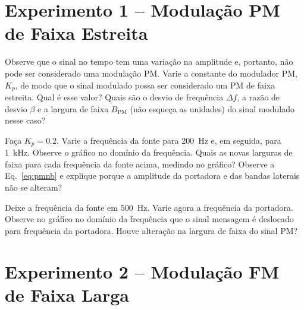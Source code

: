 \documentclass[12pt,addpoints]{exam}
\begin{document}
\section*{Experimento 1 -- Modulação PM de Faixa Estreita}

\begin{questions}
    \question Observe que o sinal no tempo tem uma variação na amplitude e, portanto, não pode ser considerado uma modulação PM. Varie a constante do modulador PM, $K_{p}$, de modo que o sinal modulado possa ser considerado um PM de faixa estreita. Qual é esse valor? Quais são o desvio de frequência $\Delta f$, a razão de desvio $\beta$ e a largura de faixa $B_{\text{PM}}$ (não esqueça as unidades) do sinal modulado nesse caso?
    \fillwithlines{1.25in}
    
    \question Faça $K_{p} = 0.2$. Varie a frequência da fonte para 200~Hz e, em seguida, para 1~kHz. Observe o gráfico no domínio da frequência. Quais as novas larguras de faixa para cada frequência da fonte acima, medindo no gráfico? Observe a Eq.~\ref{eq:pmnb} e explique porque a amplitude da portadora e das bandas laterais não se alteram?
    \fillwithlines{1.25in}
    
    \question Deixe a frequência da fonte em $500$~Hz. Varie agora a frequência da portadora. Observe no gráfico no domínio da frequência que o sinal mensagem é deslocado para frequência da portadora. Houve alteração na largura de faixa do sinal PM?
    \fillwithlines{1.25in}
\end{questions}

\section*{Experimento 2 -- Modulação FM de Faixa Larga}
\end{document}
